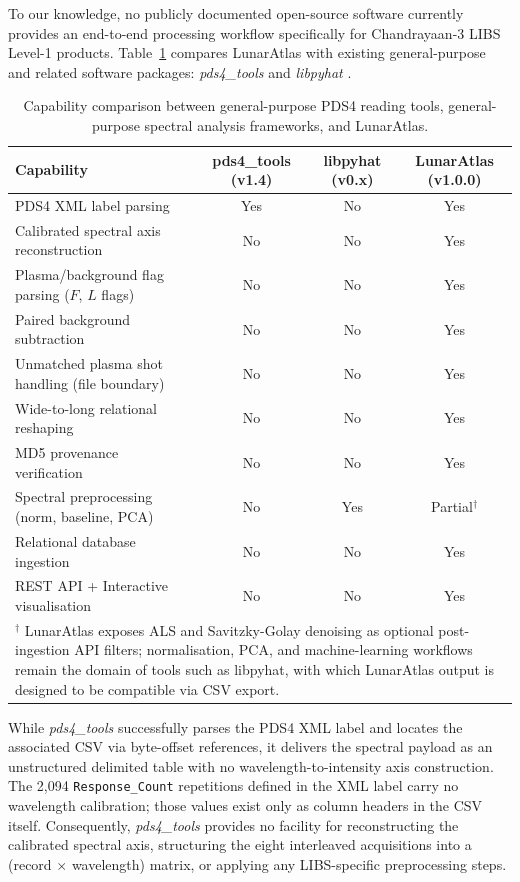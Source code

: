 \documentclass[final,5p,twocolumn,a4paper]{elsarticle}
\begin{document}
To our knowledge, no publicly documented open-source software currently provides an end-to-end processing workflow specifically for Chandrayaan-3 LIBS Level-1 products. Table~\ref{table:capability_comparison} compares LunarAtlas with existing general-purpose and related software packages: \emph{pds4\_tools} \cite{pds4_tools_ref} and \emph{libpyhat} \cite{anderson2019libpyhat}.

\begin{table}[!htbp]
\centering
\small
\setlength{\tabcolsep}{6pt}
\begin{tabular}{lccc}
\toprule
\textbf{Capability} & \textbf{pds4\_tools (v1.4)} \cite{pds4_tools_ref} & \textbf{libpyhat (v0.x)} \cite{anderson2019libpyhat} & \textbf{LunarAtlas (v1.0.0)} \\
\midrule
PDS4 XML label parsing & Yes & No & Yes \\
Calibrated spectral axis reconstruction & No & No & Yes \\
Plasma/background flag parsing ($F$, $L$ flags) & No & No & Yes \\
Paired background subtraction & No & No & Yes \\
Unmatched plasma shot handling (file boundary) & No & No & Yes \\
Wide-to-long relational reshaping & No & No & Yes \\
MD5 provenance verification & No & No & Yes \\
Spectral preprocessing (norm, baseline, PCA) & No & Yes & Partial$^\dagger$ \\
Relational database ingestion & No & No & Yes \\
REST API + Interactive visualisation & No & No & Yes \\
\bottomrule
\multicolumn{4}{p{0.95\textwidth}}{\footnotesize $^\dagger$ LunarAtlas exposes ALS and Savitzky-Golay denoising as optional post-ingestion API filters; normalisation, PCA, and machine-learning workflows remain the domain of tools such as libpyhat, with which LunarAtlas output is designed to be compatible via CSV export.}
\end{tabular}
\caption{Capability comparison between general-purpose PDS4 reading tools, general-purpose spectral analysis frameworks, and LunarAtlas.}
\label{table:capability_comparison}
\end{table}

While \emph{pds4\_tools} successfully parses the PDS4 XML label and locates the associated CSV via byte-offset references, it delivers the spectral payload as an unstructured delimited table with no wavelength-to-intensity axis construction. The 2,094 \texttt{Response\_Count} repetitions defined in the XML label carry no wavelength calibration; those values exist only as column headers in the CSV itself. Consequently, \emph{pds4\_tools} provides no facility for reconstructing the calibrated spectral axis, structuring the eight interleaved acquisitions into a (record $\times$ wavelength) matrix, or applying any LIBS-specific preprocessing steps.
\end{document}
